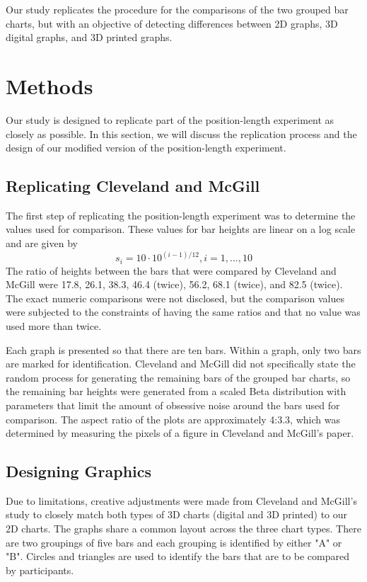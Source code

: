 \documentclass[letterpaper, inpress]{jds} %
\begin{document}
Our study replicates the procedure for the comparisons of the two grouped bar charts, but with an objective of detecting differences between 2D graphs, 3D digital graphs, and 3D printed graphs.

\section{Methods}

Our study is designed to replicate part of the position-length experiment as closely as possible. 
In this section, we will discuss the replication process and the design of our modified version of the position-length experiment.

\subsection{Replicating Cleveland and McGill}

The first step of replicating the position-length experiment was to determine the values used for comparison. These values for bar heights are linear on a log scale and are given by 
\[s_i=10\cdot 10^{(i-1)/12}, i=1,...,10\]
The ratio of heights between the bars that were compared by Cleveland and McGill were 17.8, 26.1, 38.3, 46.4 (twice), 56.2, 68.1 (twice), and 82.5 (twice). 
The exact numeric comparisons were not disclosed, but the comparison values were subjected to the constraints of having the same ratios and that no value was used more than twice.

Each graph is presented so that there are ten bars. 
Within a graph, only two bars are marked for identification.
Cleveland and McGill did not specifically state the random process for generating the remaining bars of the grouped bar charts, so the remaining bar heights were generated from a scaled Beta distribution with parameters that limit the amount of obsessive noise around the bars used for comparison. The aspect ratio of the plots are approximately 4:3.3, which was determined by measuring the pixels of a figure in Cleveland and McGill's paper. 

\subsection{Designing Graphics}

Due to limitations, creative adjustments were made from Cleveland and McGill's study to closely match both types of 3D charts (digital and 3D printed) to our 2D charts. 
The graphs share a common layout across the three chart types. 
There are two groupings of five bars and each grouping is identified by either "A" or "B". Circles and triangles are used to identify the bars that are to be compared by participants.
\end{document}
